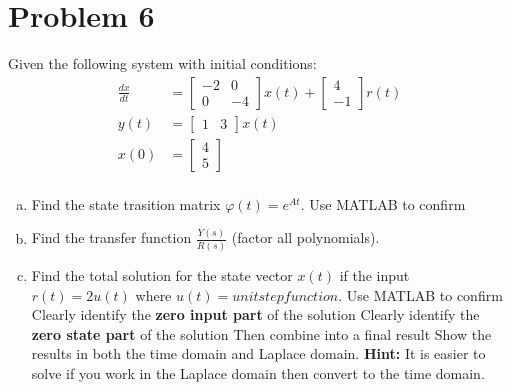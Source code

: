 \documentclass{article}
\begin{document}
\section*{Problem 6}
Given the following system with initial conditions:
\begin{align*}
\frac{dx}{dt} &= \begin{bmatrix} -2 & 0 \\ 0 & -4 \end{bmatrix} x(t) + \begin{bmatrix} 4 \\ -1 \end{bmatrix} r(t) \\
y(t) &= \begin{bmatrix} 1 & 3 \end{bmatrix} x(t) \\
x(0) &= \begin{bmatrix} 4 \\ 5 \end{bmatrix} \\
\end{align*}
\begin{enumerate}[a)]
\item Find the state trasition matrix $\varphi (t) = e^{At}$. 
{\color{blue} Use MATLAB to confirm}
\newline

\item Find the transfer function $\frac{Y(s)}{R(s)}$ (factor all polynomials).
\newline
\item Find the total solution for the state vector $x(t)$ if the input $r(t) = 2 u(t)$ where $u(t) = unit step function$.
{\color{blue} Use MATLAB to confirm}
\newline
\hspace*{10mm} Clearly identify the \textbf{zero input part} of the solution
\newline
\hspace*{10mm} Clearly identify the \textbf{zero state part} of the solution
\newline
\hspace*{10mm} Then combine into a final result
\newline
Show the results in both the time domain and Laplace domain.
\textbf{Hint:} It is easier to solve if you work in the Laplace domain then convert to the time domain.
\end{enumerate}
\end{document}
